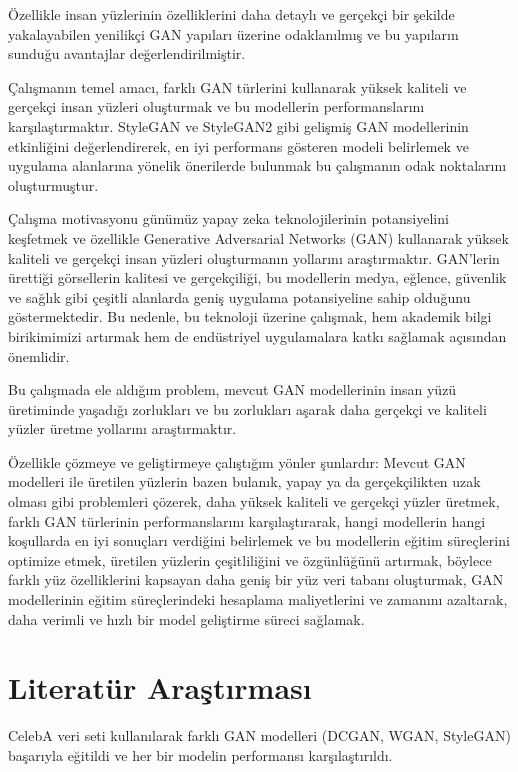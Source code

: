 \documentclass[12pt, a4paper]{article}
\begin{document}
	Özellikle insan yüzlerinin özelliklerini daha detaylı ve gerçekçi bir şekilde yakalayabilen yenilikçi GAN yapıları üzerine odaklanılmış ve bu yapıların sunduğu avantajlar değerlendirilmiştir.
	
	Çalışmanın temel amacı, farklı GAN türlerini kullanarak yüksek kaliteli ve gerçekçi insan yüzleri oluşturmak ve bu modellerin performanslarını karşılaştırmaktır. StyleGAN ve StyleGAN2 gibi gelişmiş GAN modellerinin etkinliğini değerlendirerek, en iyi performans gösteren modeli belirlemek ve uygulama alanlarına yönelik önerilerde bulunmak bu çalışmanın odak noktalarını oluşturmuştur.
	
	Çalışma motivasyonu günümüz yapay zeka teknolojilerinin potansiyelini keşfetmek ve özellikle Generative Adversarial Networks (GAN) kullanarak yüksek kaliteli ve gerçekçi insan yüzleri oluşturmanın yollarını araştırmaktır. GAN'lerin ürettiği görsellerin kalitesi ve gerçekçiliği, bu modellerin medya, eğlence, güvenlik ve sağlık gibi çeşitli alanlarda geniş uygulama potansiyeline sahip olduğunu göstermektedir. Bu nedenle, bu teknoloji üzerine çalışmak, hem akademik bilgi birikimimizi artırmak hem de endüstriyel uygulamalara katkı sağlamak açısından önemlidir.
	
	Bu çalışmada ele aldığım problem, mevcut GAN modellerinin insan yüzü üretiminde yaşadığı zorlukları ve bu zorlukları aşarak daha gerçekçi ve kaliteli yüzler üretme yollarını araştırmaktır. 
	
	Özellikle çözmeye ve geliştirmeye çalıştığım yönler şunlardır: Mevcut GAN modelleri ile üretilen yüzlerin bazen bulanık, yapay ya da gerçekçilikten uzak olması gibi problemleri çözerek, daha yüksek kaliteli ve gerçekçi yüzler üretmek, farklı GAN türlerinin performanslarını karşılaştırarak, hangi modellerin hangi koşullarda en iyi sonuçları verdiğini belirlemek ve bu modellerin eğitim süreçlerini optimize etmek, üretilen yüzlerin çeşitliliğini ve özgünlüğünü artırmak, böylece farklı yüz özelliklerini kapsayan daha geniş bir yüz veri tabanı oluşturmak, GAN modellerinin eğitim süreçlerindeki hesaplama maliyetlerini ve zamanını azaltarak, daha verimli ve hızlı bir model geliştirme süreci sağlamak.
	
	\section{Literatür Araştırması}
	
	CelebA veri seti kullanılarak farklı GAN modelleri (DCGAN, WGAN, StyleGAN) başarıyla eğitildi ve her bir modelin performansı karşılaştırıldı.
	
\end{document}
